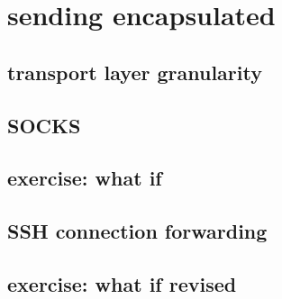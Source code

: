 \section{sending encapsulated}

\subsection{transport layer granularity}


\subsection{SOCKS}


\subsection{exercise: what if}


\subsection{SSH connection forwarding}


\subsection{exercise: what if revised}



